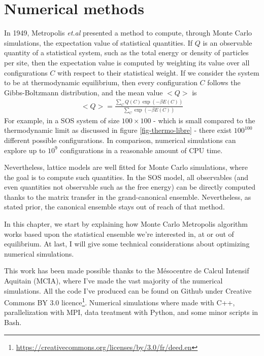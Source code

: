 \chapter{Numerical methods}
\label{chap-sim}

In 1949, Metropolis {\it et.al} \cite{metropolis_monte_1949} presented a method to compute, through Monte Carlo simulations, the expectation value of statistical quantities. If $Q$ is an observable quantity of a statistical system, such as the total energy or density of particles per site, then the expectation value is computed by weighting its value over all configurations $C$ with respect to their statistical weight. If we consider the system to be at thermodynamic equilibrium, then every configuration $C$ follows the Gibbs-Boltzmann distribution, and the mean value $<Q>$ is
\begin{align}
    <Q> = \frac{\sum_{C} Q(C) \exp(-\beta E(C))}{\sum_{C} \exp(-\beta E(C))}
\end{align}
For example, in a SOS system of size $100\times100$ - which is small compared to the thermodynamic limit as discussed in figure \ref{fig-thermo-libre} - there exist $100^{100}$ different possible configurations. In comparison, numerical simulations can explore up to $10^9$ configurations in a reasonable amount of CPU time.

Nevertheless, lattice models are well fitted for Monte Carlo simulations, where the goal is to compute such quantities. In the SOS model, all observables (and even quantities not observable such as the free energy) can be directly computed thanks to the matrix transfer in the grand-canonical ensemble. Nevertheless, as stated prior, the canonical ensemble stays out of reach of that method.

In this chapter, we start by explaining how Monte Carlo Metropolis algorithm works based upon the statistical ensemble we're interested in, at or out of equilibrium.
At last, I will give some technical considerations about optimizing numerical simulations.

This work has been made possible thanks to the Mésocentre de Calcul Intensif Aquitain (MCIA)\cite{noauthor_mesocentre_nodate}, where I've made the vast majority of the numerical simulations.
All the code I've produced can be found on Github \cite{paul_gersberg_github_2020} under Creative Commons BY 3.0 licence\footnote{\url{https://creativecommons.org/licenses/by/3.0/fr/deed.en}}. Numerical simulations where made with C++, parallelization with MPI, data treatment with Python, and some minor scripts in Bash.

